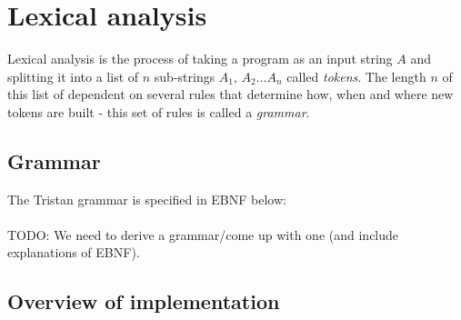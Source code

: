 
\chapter{Lexical analysis}

Lexical analysis is the process of taking a program as an input string
$A$ and splitting it into a list of $n$ sub-strings $A_{1},\,A_{2}\ldots A_{n}$
called \emph{tokens}. The length $n$ of this list of dependent on
several rules that determine how, when and where new tokens are built
- this set of rules is called a \emph{grammar}.

\section{Grammar}

The Tristan grammar is specified in EBNF below:\\
\\
TODO: We need to derive a grammar/come up with one (and include explanations
of EBNF).

\section{Overview of implementation}

